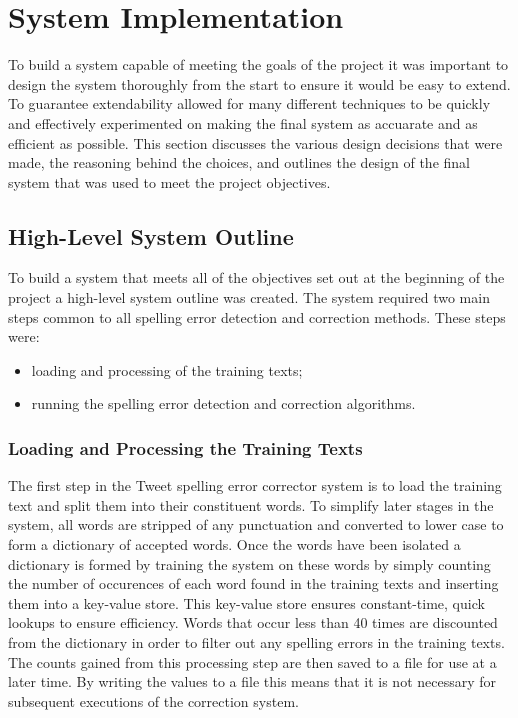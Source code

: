 \chapter{System Implementation}

To build a system capable of meeting the goals of the project it was important to design the system thoroughly from the start to ensure it would be easy to extend. To guarantee extendability allowed for many different techniques to be quickly and effectively experimented on making the final system as accuarate and as efficient as possible. This section discusses the various design decisions that were made, the reasoning behind the choices, and outlines the design of the final system that was used to meet the project objectives.

\section{High-Level System Outline}
To build a system that meets all of the objectives set out at the beginning of the project a high-level system outline was created. The system required two main steps common to all spelling error detection and correction methods. These steps were:
\begin{itemize}
	\item
	loading and processing of the training texts;
	\item
	running the spelling error detection and correction algorithms.
\end{itemize}

\subsection{Loading and Processing the Training Texts}
The first step in the Tweet spelling error corrector system is to load the training text and split them into their constituent words. To simplify later stages in the system, all words are stripped of any punctuation and converted to lower case to form a dictionary of accepted words. Once the words have been isolated a dictionary is formed by training the system on these words by simply counting the number of occurences of each word found in the training texts and inserting them into a key-value store. This key-value store ensures constant-time, quick lookups to ensure efficiency. Words that occur less than 40 times are discounted from the dictionary in order to filter out any spelling errors in the training texts. The counts gained from this processing step are then saved to a file for use at a later time. By writing the values to a file this means that it is not necessary for subsequent executions of the correction system.

